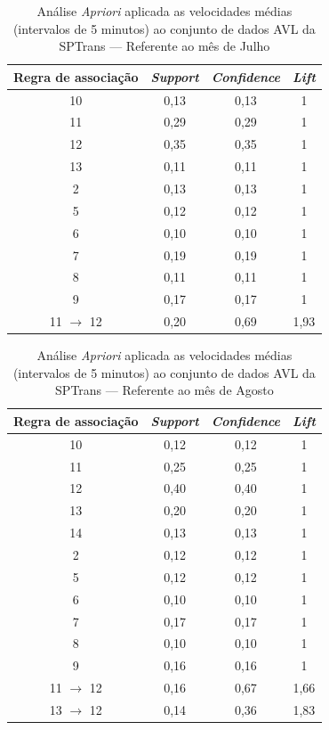 \documentclass[
	12pt,				%
	oneside,			%
	a4paper,			%
	english,			%
	brazil				%
	]{abntex2ppgsi}
\begin{document}
{{{\begin{apendicesenv}
\begin{table}[!htb]
\centering
\caption {Análise \textit{Apriori} aplicada as velocidades médias (intervalos de 5 minutos) ao conjunto de dados AVL da SPTrans --- Referente ao mês de Julho}
\label {tab:aprioriJuly}
\begin{tabular}{c|c|c|c}
\toprule
\textbf{Regra de associação} & \textit{\textbf{Support}} & \textit{\textbf{Confidence}} & \textit{\textbf{Lift}} \\
\midrule
10 &  0,13 &  0,13 &  1\\
\hline
11 &  0,29 &  0,29 &  1\\
\hline
12 &  0,35 &  0,35 &  1\\
\hline
13 &  0,11 &  0,11 &  1\\
\hline
2 &  0,13 &  0,13 &  1\\
\hline
5 &  0,12 &  0,12 &  1\\
\hline
6 &  0,10 &  0,10 &  1\\
\hline
7 &  0,19 &  0,19 &  1\\
\hline
8 &  0,11 &  0,11 &  1\\
\hline
9 &  0,17 &  0,17 &  1\\
\hline
11 $\rightarrow$ 12 &  0,20 &  0,69 &  1,93\\
\bottomrule
\end{tabular}
\end{table}

\begin{table}[!htb]
\centering
\caption {Análise \textit{Apriori} aplicada as velocidades médias (intervalos de 5 minutos) ao conjunto de dados AVL da SPTrans --- Referente ao mês de Agosto}
\label {tab:aprioriAugust}
\begin{tabular}{c|c|c|c}
\toprule
\textbf{Regra de associação} & \textit{\textbf{Support}} & \textit{\textbf{Confidence}} & \textit{\textbf{Lift}} \\
\midrule
10 &  0,12 &  0,12 &  1\\
\hline
11 &  0,25 &  0,25 &  1\\
\hline
12 &  0,40 &  0,40 &  1\\
\hline
13 &  0,20 &  0,20 &  1\\
\hline
14 &  0,13 &  0,13 &  1\\
\hline
2 &  0,12 &  0,12 &  1\\
\hline
5 &  0,12 &  0,12 &  1\\
\hline
6 &  0,10 &  0,10 &  1\\
\hline
7 &  0,17 &  0,17 &  1\\
\hline
8 &  0,10 &  0,10 &  1\\
\hline
9 &  0,16 &  0,16 &  1\\
\hline
11 $\rightarrow$ 12 &  0,16 &  0,67 &  1,66\\
\hline
13 $\rightarrow$ 12 &  0,14 &  0,36 &  1,83\\
\bottomrule
\end{tabular}
\end{table}


\end{apendicesenv}}}}
\end{document}
